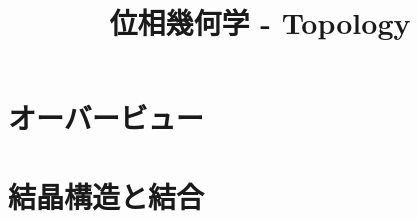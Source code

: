 \documentclass[a4paper]{jsreport}
\title{位相幾何学 - Topology}
\begin{document}
    \maketitle

    \tableofcontents

    \chapter{オーバービュー}
    \chapter{結晶構造と結合}
\end{document}
